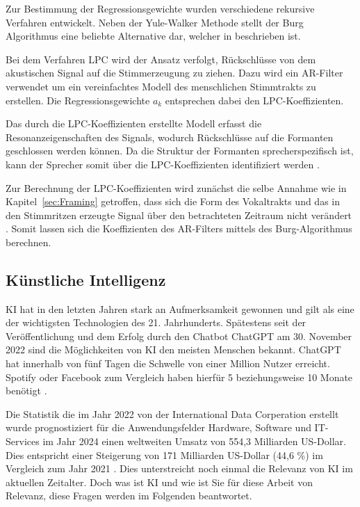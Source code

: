 Zur Bestimmung der Regressionsgewichte wurden verschiedene rekursive Verfahren entwickelt.
Neben der Yule-Walker Methode stellt der Burg Algorithmus eine beliebte Alternative dar, welcher in \citeauthor[][S. 443]{marple_new_1980} beschrieben ist.

Bei dem Verfahren \ac{LPC} wird der Ansatz verfolgt, Rückschlüsse von dem akustischen Signal auf die Stimmerzeugung zu ziehen.
Dazu wird ein \ac{AR}-Filter verwendet um ein vereinfachtes Modell des menschlichen Stimmtrakts zu erstellen.
Die Regressionsgewichte $a_k$ entsprechen dabei den \ac{LPC}-Koeffizienten.

Das durch die \ac{LPC}-Koeffizienten erstellte Modell erfasst die Resonanzeigenschaften des Signals, wodurch Rückschlüsse auf die Formanten geschlossen werden können.
Da die Struktur der Formanten sprecherspezifisch ist, kann der Sprecher somit über die \ac{LPC}-Koeffizienten identifiziert werden \autocite[vgl.][S. 117]{sidorov_text-independent_2010}.

Zur Berechnung der \ac{LPC}-Koeffizienten wird zunächst die selbe Annahme wie in Kapitel~\ref{sec:Framing} getroffen, dass sich die Form des Vokaltrakts und das in den Stimmritzen erzeugte Signal über den betrachteten Zeitraum nicht verändert \autocite[vgl.][S. 1304]{atal_effectiveness_1974}.
Somit lassen sich die Koeffizienten des \ac{AR}-Filters mittels des Burg-Algorithmus berechnen.

\subsection{Künstliche Intelligenz}
\ac{KI} hat in den letzten Jahren stark an Aufmerksamkeit gewonnen und gilt als eine der wichtigsten Technologien des 21. Jahrhunderts.
Spätestens seit der Veröffentlichung und dem Erfolg durch den Chatbot ChatGPT am 30. November 2022 sind die Möglichkeiten von \ac{KI} den meisten Menschen bekannt. 
ChatGPT hat innerhalb von fünf Tagen die Schwelle von einer Million Nutzer erreicht. 
Spotify oder Facebook zum Vergleich haben hierfür 5 beziehungsweise 10 Monate benötigt \autocite[vgl. ][]{janson_infografik_2023}.

Die Statistik die im Jahr 2022 von der International Data Corperation erstellt wurde prognostiziert für die Anwendungsfelder Hardware, Software und IT-Services im Jahr 2024 einen weltweiten Umsatz von 554,3 Milliarden US-Dollar.
Dies entspricht einer Steigerung von 171 Milliarden US-Dollar (44,6 \%) im Vergleich zum Jahr 2021 \autocite[vgl. ][]{idc_kunstliche_2022}.
Dies unterstreicht noch einmal die Relevanz von \ac{KI} im aktuellen Zeitalter.
Doch was ist \ac{KI} und wie ist Sie für diese Arbeit von Relevanz, diese Fragen werden im Folgenden beantwortet.

